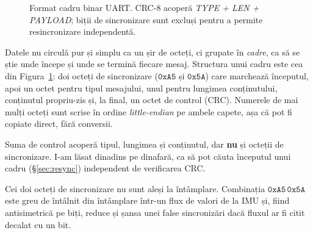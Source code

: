 \documentclass[a4paper,12pt,twoside,openany]{report}
\begin{document}
\begin{figure}[H]
\centering
{}
\caption{Format cadru binar UART. CRC-8 acoperă \textit{TYPE + LEN + PAYLOAD}; biții de sincronizare sunt excluși pentru a permite resincronizare independentă.}
\label{fig:frame-format}
\end{figure}

Datele nu circulă pur și simplu ca un șir de octeți, ci grupate în
\textit{cadre}, ca să se știe unde începe și unde se termină fiecare mesaj.
Structura unui cadru este cea din Figura~\ref{fig:frame-format}: doi octeți de
sincronizare ($\mathtt{0xA5}$ și $\mathtt{0x5A}$) care marchează începutul,
apoi un octet pentru tipul mesajului, unul pentru lungimea conținutului,
conținutul propriu-zis și, la final, un octet de control (CRC). Numerele de
mai mulți octeți sunt scrise în ordine \textit{little-endian} pe ambele
capete, așa că pot fi copiate direct, fără conversii.

Suma de control acoperă tipul, lungimea și conținutul, dar \textbf{nu} și
octeții de sincronizare. I-am lăsat dinadins pe dinafară, ca să pot căuta
începutul unui cadru (§\ref{sec:resync}) independent de verificarea CRC.

Cei doi octeți de sincronizare nu sunt aleși la întâmplare. Combinația
$\mathtt{0xA5\,0x5A}$ este greu de întâlnit din întâmplare într-un flux de
valori de la IMU și, fiind antisimetrică pe biți, reduce și șansa unei false
sincronizări dacă fluxul ar fi citit decalat cu un bit.
\end{document}
